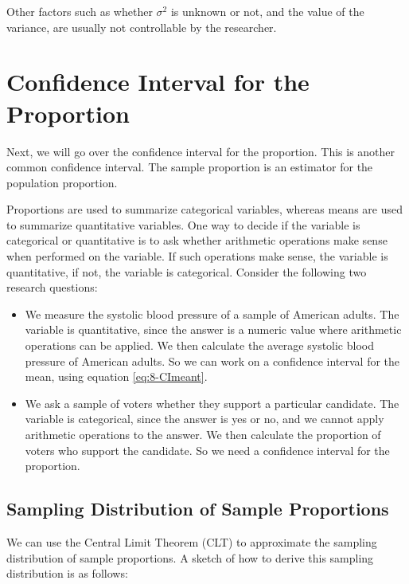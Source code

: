 \documentclass[
]{book}
\begin{document}
Other factors such as whether \(\sigma^2\) is unknown or not, and the value of the variance, are usually not controllable by the researcher.

\section{Confidence Interval for the Proportion}\label{confidence-interval-for-the-proportion}

Next, we will go over the confidence interval for the proportion. This is another common confidence interval. The sample proportion is an estimator for the population proportion.

Proportions are used to summarize categorical variables, whereas means are used to summarize quantitative variables. One way to decide if the variable is categorical or quantitative is to ask whether arithmetic operations make sense when performed on the variable. If such operations make sense, the variable is quantitative, if not, the variable is categorical. Consider the following two research questions:

\begin{itemize}
\item
  We measure the systolic blood pressure of a sample of American adults. The variable is quantitative, since the answer is a numeric value where arithmetic operations can be applied. We then calculate the average systolic blood pressure of American adults. So we can work on a confidence interval for the mean, using equation \eqref{eq:8-CImeant}.
\item
  We ask a sample of voters whether they support a particular candidate. The variable is categorical, since the answer is yes or no, and we cannot apply arithmetic operations to the answer. We then calculate the proportion of voters who support the candidate. So we need a confidence interval for the proportion.
\end{itemize}

\subsection{Sampling Distribution of Sample Proportions}\label{sampling-distribution-of-sample-proportions}

We can use the Central Limit Theorem (CLT) to approximate the sampling distribution of sample proportions. A sketch of how to derive this sampling distribution is as follows:
\end{document}
